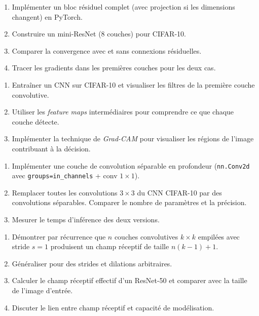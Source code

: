 \begin{exercice}
\begin{enumerate}
  \item Impl\'ementer un bloc r\'esiduel complet (avec projection si les
    dimensions changent) en PyTorch.
  \item Construire un mini-ResNet (8 couches) pour CIFAR-10.
  \item Comparer la convergence avec et sans connexions r\'esiduelles.
  \item Tracer les gradients dans les premi\`eres couches pour les deux cas.
\end{enumerate}
\end{exercice}

\begin{exercice}
\begin{enumerate}
  \item Entra\^iner un CNN sur CIFAR-10 et visualiser les filtres de la
    premi\`ere couche convolutive.
  \item Utiliser les \textit{feature maps} interm\'ediaires pour comprendre
    ce que chaque couche d\'etecte.
  \item Impl\'ementer la technique de \textit{Grad-CAM} pour visualiser les
    r\'egions de l'image contribuant \`a la d\'ecision.
\end{enumerate}
\end{exercice}

\begin{exercice}
\begin{enumerate}
  \item Impl\'ementer une couche de convolution s\'eparable en profondeur
    (\texttt{nn.Conv2d} avec \texttt{groups=in\_channels} + conv $1 \times 1$).
  \item Remplacer toutes les convolutions $3 \times 3$ du CNN CIFAR-10 par
    des convolutions s\'eparables. Comparer le nombre de param\`etres et la
    pr\'ecision.
  \item Mesurer le temps d'inf\'erence des deux versions.
\end{enumerate}
\end{exercice}

\begin{exercice}
\begin{enumerate}
  \item D\'emontrer par r\'ecurrence que $n$ couches convolutives $k \times k$
    empil\'ees avec stride $s = 1$ produisent un champ r\'eceptif de taille
    $n(k - 1) + 1$.
  \item G\'en\'eraliser pour des strides et dilations arbitraires.
  \item Calculer le champ r\'eceptif effectif d'un ResNet-50 et comparer avec
    la taille de l'image d'entr\'ee.
  \item Discuter le lien entre champ r\'eceptif et capacit\'e de
    mod\'elisation.
\end{enumerate}
\end{exercice}
